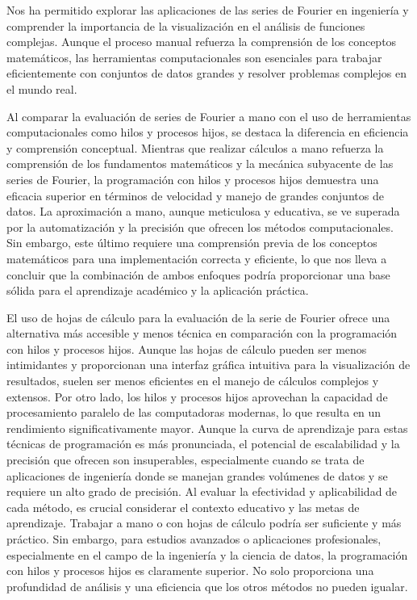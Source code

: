 Nos ha permitido explorar las aplicaciones de las series de Fourier en ingeniería y comprender la importancia de la visualización en el análisis de funciones complejas. Aunque el proceso manual refuerza la comprensión de los conceptos matemáticos, las herramientas computacionales son esenciales para trabajar eficientemente con conjuntos de datos grandes y resolver problemas complejos en el mundo real.

Al comparar la evaluación de series de Fourier a mano con el uso de herramientas computacionales como hilos y procesos hijos, se destaca la diferencia en eficiencia y comprensión conceptual. Mientras que realizar cálculos a mano refuerza la comprensión de los fundamentos matemáticos y la mecánica subyacente de las series de Fourier, la programación con hilos y procesos hijos demuestra una eficacia superior en términos de velocidad y manejo de grandes conjuntos de datos. La aproximación a mano, aunque meticulosa y educativa, se ve superada por la automatización y la precisión que ofrecen los métodos computacionales. Sin embargo, este último requiere una comprensión previa de los conceptos matemáticos para una implementación correcta y eficiente, lo que nos lleva a concluir que la combinación de ambos enfoques podría proporcionar una base sólida para el aprendizaje académico y la aplicación práctica.

El uso de hojas de cálculo para la evaluación de la serie de Fourier ofrece una alternativa más accesible y menos técnica en comparación con la programación con hilos y procesos hijos. Aunque las hojas de cálculo pueden ser menos intimidantes y proporcionan una interfaz gráfica intuitiva para la visualización de resultados, suelen ser menos eficientes en el manejo de cálculos complejos y extensos. Por otro lado, los hilos y procesos hijos aprovechan la capacidad de procesamiento paralelo de las computadoras modernas, lo que resulta en un rendimiento significativamente mayor. Aunque la curva de aprendizaje para estas técnicas de programación es más pronunciada, el potencial de escalabilidad y la precisión que ofrecen son insuperables, especialmente cuando se trata de aplicaciones de ingeniería donde se manejan grandes volúmenes de datos y se requiere un alto grado de precisión. Al evaluar la efectividad y aplicabilidad de cada método, es crucial considerar el contexto educativo y las metas de aprendizaje. Trabajar a mano o con hojas de cálculo podría ser suficiente y más práctico. Sin embargo, para estudios avanzados o aplicaciones profesionales, especialmente en el campo de la ingeniería y la ciencia de datos, la programación con hilos y procesos hijos es claramente superior. No solo proporciona una profundidad de análisis y una eficiencia que los otros métodos no pueden igualar.

